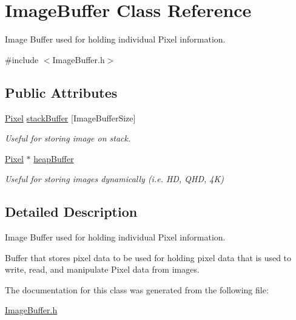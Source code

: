 \hypertarget{structImageBuffer}{}\section{Image\+Buffer Class Reference}
\label{structImageBuffer}


Image Buffer used for holding individual Pixel information.  




{\ttfamily \#include $<$Image\+Buffer.\+h$>$}

\subsection*{Public Attributes}
\begin{DoxyCompactItemize}
\item 
\mbox{\label{structImageBuffer_af227ffa1fa305889393bea75bf5decd7}} 
\hyperlink{Pixel_8h_a5255638464dae60a20a4cef759bc42ce}{Pixel} \hyperlink{structImageBuffer_af227ffa1fa305889393bea75bf5decd7}{stack\+Buffer} \mbox{[}Image\+Buffer\+Size\mbox{]}
\begin{DoxyCompactList}\small\item\em Useful for storing image on stack. \end{DoxyCompactList}\item 
\mbox{\label{structImageBuffer_a8aa6824dad60f5b974abbc9bf8cbeb76}} 
\hyperlink{Pixel_8h_a5255638464dae60a20a4cef759bc42ce}{Pixel} $\ast$ \hyperlink{structImageBuffer_a8aa6824dad60f5b974abbc9bf8cbeb76}{heap\+Buffer}
\begin{DoxyCompactList}\small\item\em Useful for storing images dynamically (i.\+e. HD, Q\+HD, 4K) \end{DoxyCompactList}\end{DoxyCompactItemize}


\subsection{Detailed Description}
Image Buffer used for holding individual Pixel information. 

Buffer that stores pixel data to be used for holding pixel data that is used to write, read, and manipulate Pixel data from images. 

The documentation for this class was generated from the following file\+:\begin{DoxyCompactItemize}
\item 
\hyperlink{ImageBuffer_8h}{Image\+Buffer.\+h}\end{DoxyCompactItemize}
